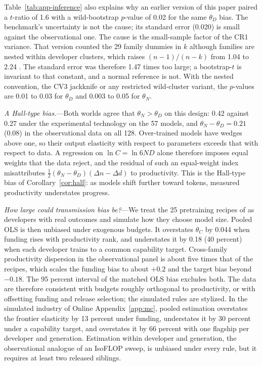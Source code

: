 

Table~\ref{tab:app-inference} also explains why an earlier version of this paper paired a $t$-ratio of 1.6 with a
wild-bootstrap $p$-value of 0.02 for the same $\theta_D$ bias. The benchmark's uncertainty is not the cause; its
standard error (0.020) is small against the observational one. The cause is the small-sample factor of the CR1
variance. That version counted the 29 family dummies in $k$ although families are nested within developer clusters,
which raises $(n-1)/(n-k)$ from 1.04 to 2.24 \citep{cameron2015practitioner}. The standard error was therefore 1.47
times too large; a bootstrap-$t$ is invariant to that constant, and a normal reference is not. With the nested
convention, the CV3 jackknife or any restricted wild-cluster variant, the $p$-values are 0.01 to 0.03 for $\theta_D$ and
0.003 to 0.05 for $\theta_N$.

\emph{A Hall-type bias.}---Both worlds agree that $\theta_N>\theta_D$ on this design: 0.42 against 0.27 under the
experimental technology on the 57 models, and $\theta_N-\theta_D=0.21$ (0.08) in the observational data on all 128.
Over-trained models have wedges above one, so their output elasticity with respect to parameters exceeds that with
respect to data. A regression on $\ln C=\ln6ND$ alone therefore imposes equal weights that the data reject, and the
residual of such an equal-weight index misattributes $\tfrac12(\theta_N-\theta_D)(\Delta n-\Delta d)$ to productivity.
This is the Hall-type bias of Corollary~\ref{cor:hall}: as models shift further toward tokens, measured productivity
understates progress.

\emph{How large could transmission bias be?}---We treat the 25 pretraining recipes of \citet{magnusson2025datadecide}
as developers with real outcomes and simulate how they choose model size. Pooled OLS is then unbiased under exogenous
budgets. It overstates $\theta_C$ by 0.044 when funding rises with productivity rank, and understates it by 0.18 (40
percent) when each developer trains to a common capability target. Cross-family productivity dispersion in the
observational panel is about five times that of the recipes, which scales the funding bias to about $+0.2$ and the
target bias beyond $-0.18$. The 95 percent interval of the matched OLS bias excludes both. The data are therefore
consistent with budgets roughly orthogonal to productivity, or with offsetting funding and release selection; the
simulated rules are stylized. In the simulated industry of Online Appendix~\ref{app:mc}, pooled estimation overstates
the frontier elasticity by 13 percent under funding, understates it by 30 percent under a capability target, and
overstates it by 66 percent with one flagship per developer and generation. Estimation within developer and generation,
the observational analogue of an IsoFLOP sweep, is unbiased under every rule, but it requires at least two released
siblings.

